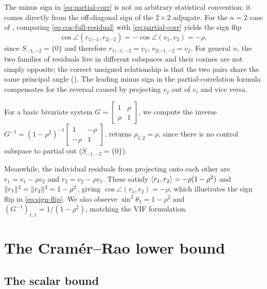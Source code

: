 \documentclass{IEEEtran}
\begin{document}
The minus sign in \eqref{eq:partial-corr} is not an arbitrary statistical convention: it comes directly from the off-diagonal sign of the $2 \times 2$ adjugate. For the $n=2$ case of , comparing \eqref{eq:cos-full-residual} with \eqref{eq:partial-corr} yields the sign flip
\begin{equation}  \label{eq:sign-flip}
  \cos\angle(r_{1|-1}, r_{2|-2}) = -\cos\angle(v_{1}, v_{2}) = -\rho ,
\end{equation}
since $S_{-1,-2} = \{0\}$ and therefore $r_{1|-1,-2} = v_{1}$, $r_{2|-1,-2} = v_{2}$. For general $n$, the two families of residuals live in different subspaces and their cosines are not simply opposite; the correct unsigned relationship is that the two pairs share the same principal angle (). The leading minus sign in the partial-correlation formula compensates for the reversal caused by projecting $v_{j}$ out of $v_{i}$ and vice versa.

\begin{example}[$n = 2$]
  \label{ex:n2}
  For a basic bivariate system $G =
  \begin{bmatrix}
    1 & \rho \\
    \rho & 1
  \end{bmatrix}$, we compute the inverse $G^{-1} = (1-\rho^{2})^{-1}
  \begin{bmatrix}
    1 & -\rho \\
    -\rho & 1
  \end{bmatrix}$.  returns $\rho_{1,2} = \rho$, since there is no control subspace to partial out ($S_{-1,-2} = \{0\}$).

  Meanwhile, the individual residuals from projecting onto each other are $r_{1} = v_{1} - \rho v_{2}$ and $r_{2} = v_{2} - \rho v_{1}$. These satisfy $\langle r_{1}, r_{2}\rangle = -\rho(1-\rho^{2})$ and $\lVert r_{1}\rVert^{2} = \lVert r_{2}\rVert^{2} = 1-\rho^{2}$, giving $\cos\angle(r_{1},r_{2}) = -\rho$, which illustrates the sign flip in \eqref{eq:sign-flip}. We also observe $\sin^{2}\theta_{1} = 1 - \rho^{2}$ and $(G^{-1})_{1,1} = 1/(1-\rho^{2})$, matching the VIF formulation.
\end{example}

\section{The Cram\'er--Rao lower bound}\label{sec:crlb}

\subsection{The scalar bound}\label{subsec:scalar-crlb}
\end{document}
